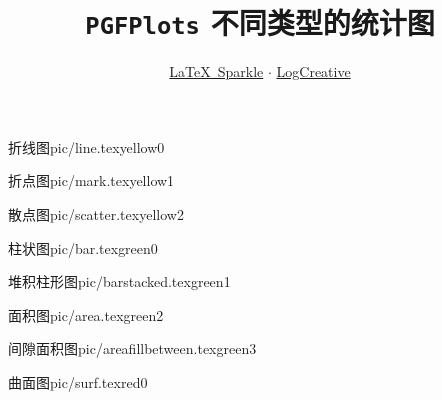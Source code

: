 \documentclass[a4paper,12pt]{article}
\title{\texttt{PGFPlots} 不同类型的统计图}
\author{\href{https://logcreative.github.io/LaTeXSparkle/index.html}{\LaTeX\ Sparkle} $\cdot$ \href{https://space.bilibili.com/31271993}{LogCreative}}
\date{}
\begin{document}
\begin{CJK}{UTF8}{song} %
    \maketitle

    \begin{graphbox}{折线图}{pic/line.tex}{yellow}{0}
    \end{graphbox}
    
    \begin{graphbox}{折点图}{pic/mark.tex}{yellow}{1}
    \end{graphbox}

    \begin{graphbox}{散点图}{pic/scatter.tex}{yellow}{2}
    \end{graphbox}

    \begin{graphbox}{柱状图}{pic/bar.tex}{green}{0}
    \end{graphbox}

    \begin{graphbox}{堆积柱形图}{pic/barstacked.tex}{green}{1}
    \end{graphbox}

    \begin{graphbox}{面积图}{pic/area.tex}{green}{2}
    \end{graphbox}

    \begin{graphbox}{间隙面积图}{pic/areafillbetween.tex}{green}{3}
    \end{graphbox}

    \begin{graphbox}{曲面图}{pic/surf.tex}{red}{0}
    \end{graphbox}
\end{CJK}
\end{document}
